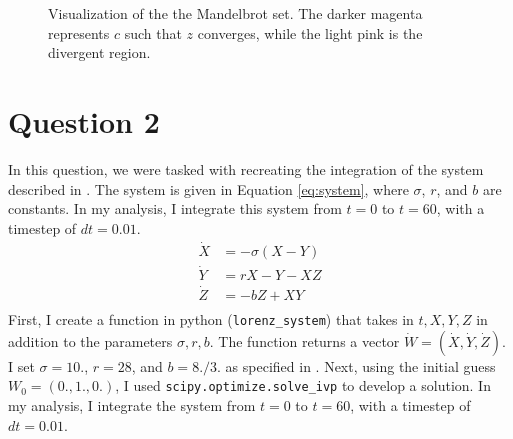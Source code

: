\documentclass[linenumbers,trackchanges]{aastex7}
\begin{document}
\begin{figure}[h!]
     \caption{Visualization of the the Mandelbrot set. The darker magenta represents $c$ such that $z$ converges, while the light pink is the divergent region.}
     \label{fig:q1p2}
\end{figure}
\section{Question 2}
In this question, we were tasked with recreating the integration of the system described in \citet{lorenz_deterministic_1963}. The system is given in Equation \ref{eq:system}, where $\sigma$, $r$, and $b$ are constants. In my analysis, I integrate this system from $t = 0$ to $t = 60$, with a timestep of $dt = 0.01$.
\begin{align}\label{eq:system}
     \dot{X} &= -\sigma (X - Y)\\
     \dot{Y} &= rX - Y - XZ\\
     \dot{Z} &= -bZ + XY\\
\end{align}
First, I create a function in python (\verb|lorenz_system|) that takes in $t, X, Y, Z$ in addition to the parameters $\sigma, r, b$. The function returns a vector $\dot{W} = (\dot{X}, \dot{Y}, \dot{Z})$. I set $\sigma = 10.$, $r = 28$, and $b = 8./3.$ as specified in \citet{lorenz_deterministic_1963}. Next, using the initial guess $W_0 = (0., 1., 0.)$, I used \verb|scipy.optimize.solve_ivp| to develop a solution. In my analysis, I integrate the system from $t = 0$ to $t = 60$, with a timestep of $dt = 0.01$.
\end{document}
